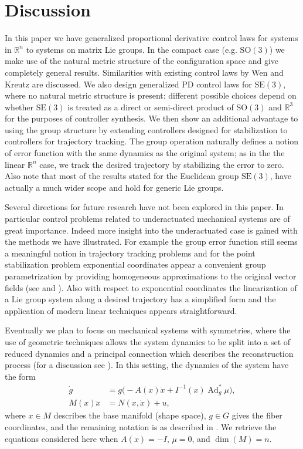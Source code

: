 \documentclass[10pt,twocolumn]{article}
\newcommand{\SO}{\mathrm{SO}}
\newcommand{\SE}{\mathrm{SE}}
\newcommand{\Ad}{\operatorname{Ad}}
\newcommand{\R}{\mathbb R}
\begin{document}
\section{Discussion}\label{sec:discussion}
In this paper we have generalized proportional derivative control laws for systems in $\R^n$ to systems on matrix Lie groups. In the compact case (e.g. $\SO(3)$) we make use of the natural metric structure of the configuration space and give completely general results. Similarities with existing control laws by Wen and Kreutz \cite{13} are discussed. We also design generalized PD control laws for $\SE(3)$, where no natural metric structure is present: different possible choices depend on whether $\SE(3)$ is treated as a direct or semi-direct product of $\SO(3)$ and $\R^3$ for the purposes of controller synthesis. We then show an additional advantage to using the group structure by extending controllers designed for stabilization to controllers for trajectory tracking. The group operation naturally defines a notion of error function with the same dynamics as the original system; as in the the linear $\R^n$ case, we track the desired trajectory by stabilizing the error to zero. Also note that most of the results stated for the Euclidean group $\SE(3)$, have actually a much wider scope and hold for generic Lie groups.

Several directions for future research have not been explored in this paper. In particular control problems related to underactuated mechanical systems are of great importance. Indeed more insight into the underactuated case is gained with the methods we have illustrated. For example the group error function still seems a meaningful notion in trajectory tracking problems and for the point stabilization problem exponential coordinates appear a convenient group parametrization by providing homogeneous approximations to the original vector fields (see \cite{16} and \cite{8}). Also with respect to exponential coordinates the linearization of a Lie group system along a desired trajectory has a simplified form and the application of modern linear techniques appears straightforward.

Eventually we plan to focus on mechanical systems with symmetries, where the use of geometric techniques allows the system dynamics to be split into a set of reduced dynamics and a principal connection which describes the reconstruction process (for a discussion see \cite{17}). In this setting, the dynamics of the system have the form
\begin{align*}
\dot g&=g\bigl(-A(x)\dot x+I^{-1}(x)\Ad_g^*\mu\bigr),\\
M(x)\ddot x&=N(x,\dot x)+u,
\end{align*}
where $x\in M$ describes the base manifold (shape space), $g\in G$ gives the fiber coordinates, and the remaining notation is as described in \cite{17}. We retrieve the equations considered here when $A(x)=-I$, $\mu=0$, and $\dim(M)=n$.
\end{document}
